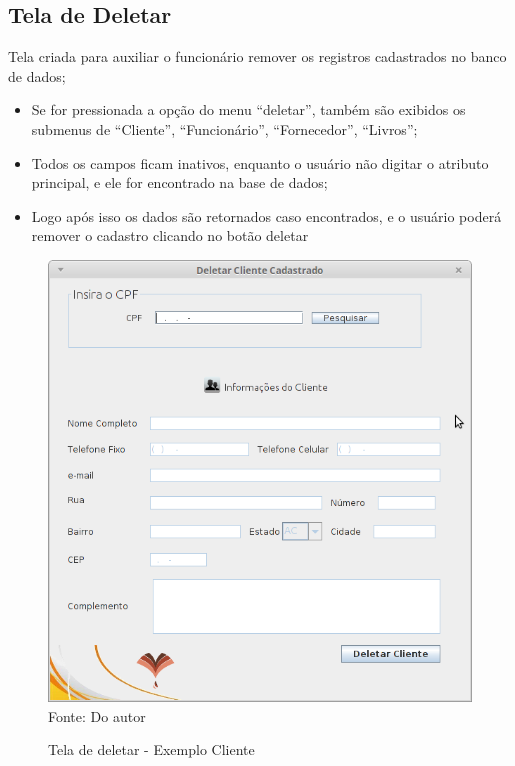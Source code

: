  
\subsection{Tela de Deletar}

Tela criada para auxiliar o funcionário remover os registros cadastrados no banco de dados;

\begin{itemize}
 \item Se for pressionada a opção do menu “deletar”, também são exibidos os submenus de “Cliente”, “Funcionário”, “Fornecedor”, “Livros”;

  \item Todos os campos ficam inativos, enquanto o usuário não digitar o atributo principal, e ele for encontrado na base de dados;
  
  \item Logo após isso os dados são retornados caso encontrados, e o usuário poderá remover o cadastro clicando no botão deletar
 \end{itemize}

\begin{figure}[H]
	\centering 
	\caption{Tela de deletar - Exemplo Cliente}
	\label{Deletar_cliente}
	\includegraphics[scale = 0.6]{imagens/tela-deletar-cliente.png}
	\\Fonte: Do autor
\end{figure}


